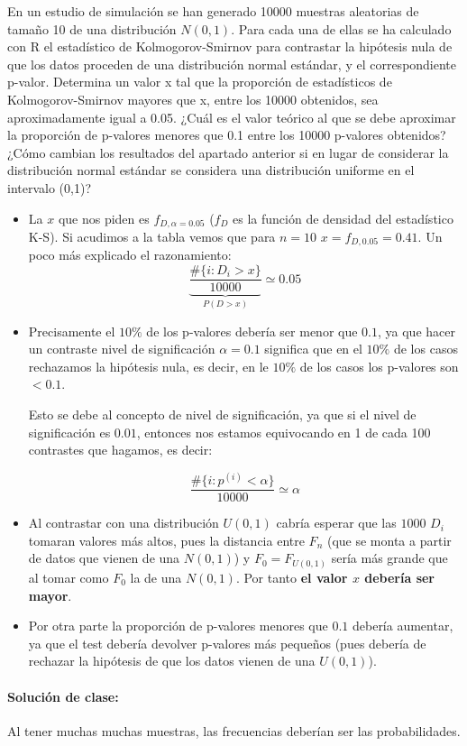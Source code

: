 \begin{problem}[12] En un estudio de simulación se han generado 10000 muestras aleatorias de tamaño 10 de una
distribución $N(0,1)$. Para cada una de ellas se ha calculado con R el estadístico de Kolmogorov-Smirnov
para contrastar la hipótesis nula de que los datos proceden de una distribución normal
estándar, y el correspondiente p-valor.
\ppart
Determina un valor x tal que la proporción de estadísticos de Kolmogorov-Smirnov mayores
que x, entre los 10000 obtenidos, sea aproximadamente igual a 0.05. ¿Cuál es el valor teórico al que
se debe aproximar la proporción de p-valores menores que 0.1 entre los 10000 p-valores obtenidos?
\ppart
¿Cómo cambian los resultados del apartado anterior si en lugar de considerar la distribución
normal estándar se considera una distribución uniforme en el intervalo (0,1)?
\solution


\spart
\begin{itemize}
	\item La $x$ que nos piden es $f_{D,α=0.05}$ ($f_D$ es la función de densidad del estadístico K-S). Si acudimos a la tabla vemos que para $n=10$ $x = f_{D,0.05} = 0.41$. Un poco más explicado el razonamiento:
	\[
		\underbrace{\frac{\#\{i : D_i > x\}}{10000}}_{P(D>x)} \simeq 0.05
	\]

	\item Precisamente el $10\%$ de los p-valores debería ser menor que $0.1$, ya que hacer un contraste nivel de significación $α=0.1$ significa que en el $10\%$ de los casos rechazamos la hipótesis nula, es decir, en le $10\%$ de los casos los p-valores son $<0.1$.

	Esto se debe al concepto de nivel de significación, ya que si el nivel de significación es $0.01$, entonces nos estamos equivocando en 1 de cada 100 contrastes que hagamos, es decir:

	\[
		\frac{\# \{ i : p^{(i)} < α\}}{10000} \simeq α
	\]
\end{itemize}

\spart
\begin{itemize}
	\item Al contrastar con una distribución $U(0,1)$ cabría esperar que las $1000$ $D_i$ tomaran valores más altos, pues la distancia entre $F_n$ (que se monta a partir de datos que vienen de una $N(0,1)$) y $F_0=F_{U(0,1)}$ sería más grande que al tomar como $F_0$ la de una $N(0,1)$. Por tanto \textbf{el valor $x$ debería ser mayor}.

	\item Por otra parte la proporción de p-valores menores que $0.1$ debería aumentar, ya que el test debería devolver p-valores más pequeños (pues debería de rechazar la hipótesis de que los datos vienen de una $U(0,1)$).
\end{itemize}

\paragraph{Solución de clase:}

Al tener muchas muchas muestras, las frecuencias deberían ser las probabilidades.

\end{problem}
